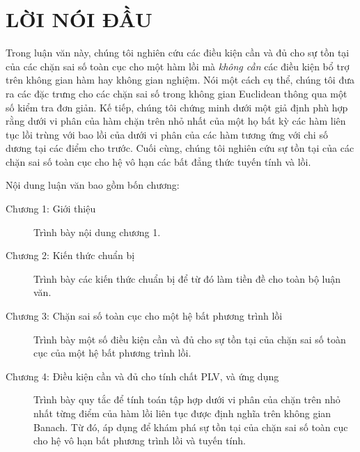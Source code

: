 \chapter*{LỜI NÓI ĐẦU}

Trong luận văn này, chúng tôi nghiên cứu các điều kiện cần và đủ cho sự tồn tại của các chặn sai số toàn cục cho một hàm lồi mà \emph{không cần} các điều kiện bổ trợ trên không gian hàm hay không gian nghiệm. Nói một cách cụ thể, chúng tôi đưa ra các đặc trưng cho các chặn sai số trong không gian Euclidean thông qua một số kiểm tra đơn giản. Kế tiếp, chúng tôi chứng minh dưới một giả định phù hợp rằng dưới vi phân của hàm chặn trên nhỏ nhất của một họ bất kỳ các hàm liên tục lồi trùng với bao lồi của dưới vi phân của các hàm tương ứng với chi số dương tại các điểm cho trước. Cuối cùng, chúng tôi nghiên cứu sự tồn tại của các chặn sai số toàn cục cho hệ vô hạn các bất đẳng thức tuyến tính và lồi. 

Nội dung luận văn bao gồm bốn chương:

\begin{description}
    \item [Chương 1: Giới thiệu] Trình bày nội dung chương 1.
    \item [Chương 2: Kiến thức chuẩn bị] Trình bày các kiến thức chuẩn bị để từ đó làm
tiền đề cho toàn bộ luận văn.
    \item [Chương 3: Chặn sai số toàn cục cho một hệ bất phương trình lồi] Trình bày một số điều kiện cần và đủ cho sự tồn tại của chặn sai số toàn cục của một hệ bất phương trình lồi. 
    \item [Chương 4: Điều kiện cần và đủ cho tính chất PLV, và ứng dụng] Trình bày quy tắc để tính toán tập hợp dưới vi phân của chặn trên nhỏ nhất từng điểm của hàm lồi liên tục được định nghĩa trên không gian Banach. Từ đó, áp dụng để khám phá sự tồn tại của chặn sai số toàn cục cho hệ vô hạn bất phương trình lồi và tuyến tính.
\end{description}

